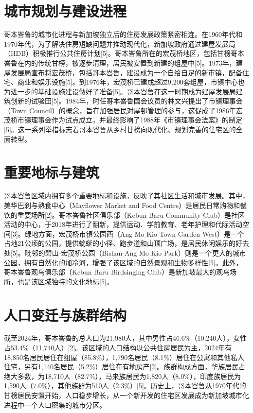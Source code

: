 \documentclass[11pt,a4paper,twoside,openany]{book}
\begin{document}
\section{城市规划与建设进程}
哥本峇鲁的城市化进程与新加坡独立后的住房发展政策紧密相连。在1960年代和1970年代，为了解决住房短缺问题并推动现代化，新加坡政府通过建屋发展局（HDB）积极推行公共住房计划[5]。哥本峇鲁所在的宏茂桥地区，包括甘榜哥本峇鲁在内的传统甘榜，被逐步清理，居民被安置到新建的组屋中[5]。1973年，建屋发展局宣布将宏茂桥，包括哥本峇鲁，建设成为一个自给自足的新市镇，配备住宅、商业和娱乐设施[5]。到1976年，宏茂桥已建成超过9,200套组屋，市镇中心也为进一步的基础设施建设做好了准备[5]。哥本峇鲁在这一时期成为建屋发展局建筑创新的试验田[5]。1984年，时任哥本峇鲁国会议员的林文兴提出了市镇理事会（Town Council）的概念，旨在加强居民对屋邨管理的参与，这促成了1986年宏茂桥市镇理事会作为试点成立，并最终影响了1988年《市镇理事会法案》的制定[5]。这一系列举措标志着哥本峇鲁从乡村甘榜向现代化、规划完善的住宅区的全面转型。

\section{重要地标与建筑}
哥本峇鲁区域内拥有多个重要地标和设施，反映了其社区生活和城市发展。其中，美华巴刹与熟食中心（Mayflower Market and Food Centre）是居民日常购物和餐饮的重要场所[2]。哥本峇鲁社区俱乐部（Kebun Baru Community Club）是社区活动的中心，于2018年进行了翻新，提供运动、学前教育、老年护理和代际活动空间[3]。绿地方面，宏茂桥市镇公园西（Ang Mo Kio Town Garden West）是一个占地21公顷的公园，提供蜿蜒的小径、跑步道和山顶广场，是居民休闲娱乐的好去处[5]。毗邻的碧山-宏茂桥公园（Bishan-Ang Mo Kio Park）则是一个更大的城市公园，拥有自然化的加冷河，增强了该区域的自然景观和生物多样性[5]。此外，哥本峇鲁观鸟俱乐部（Kebun Baru Birdsinging Club）是新加坡最大的观鸟场所，也是该区域独特的文化地标[5]。

\section{人口变迁与族群结构}
截至2024年，哥本峇鲁的总人口为21,980人，其中男性占46.6\%（10,240人），女性占53.4\%（11,740人）[2]。该区域的人口结构以公共住房居民为主，2024年有18,850名居民居住在组屋（85.8\%），1,790名居民（8.1\%）居住在公寓和其他私人住宅，另有1,140名居民（5.2\%）居住在有地房产[2]。族群构成方面，华族居民占绝大多数，为18,710人（82.7\%），马来族居民为1,820人（8.0\%），印度族居民为1,590人（7.0\%），其他族群为510人（2.3\%）[5]。历史上，哥本峇鲁从1970年代的甘榜居民安置开始，人口稳步增长，从一个新开发的住宅区发展成为新加坡城市化进程中一个人口密集的城市分区。
\end{document}
